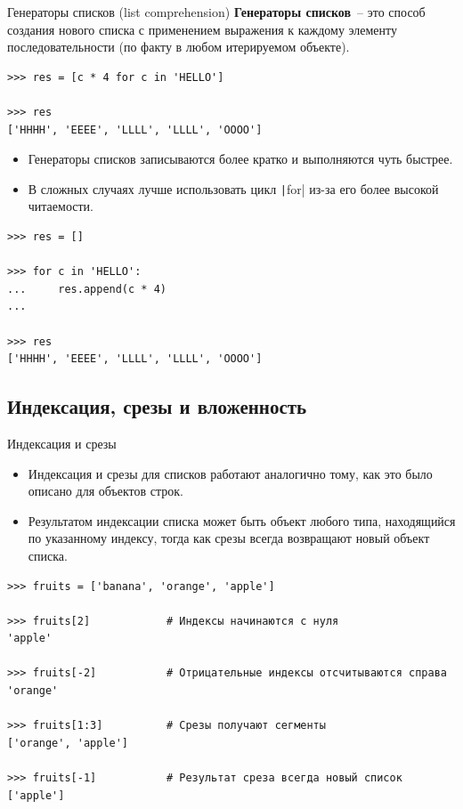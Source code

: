 \documentclass[aspectratio=169, mathserif]{beamer}%
\begin{document}
\begin{frame}[fragile]{Генераторы списков (list comprehension)}
\scriptsize
\textcolor{extraorange}{\textbf{Генераторы списков}}~-- это способ создания нового списка с применением выражения к каждому элементу последовательности (по факту в любом итерируемом объекте).

\begin{verbatim}
>>> res = [c * 4 for c in 'HELLO']

>>> res
['HHHH', 'EEEE', 'LLLL', 'LLLL', 'OOOO']
\end{verbatim}

\begin{itemize}
\item Генераторы списков записываются более кратко и выполняются чуть быстрее.

\item В сложных случаях лучше использовать цикл \texttt|for| из-за его более высокой читаемости.
\end{itemize}

\begin{verbatim}
>>> res = []

>>> for c in 'HELLO':
...     res.append(c * 4)
...

>>> res
['HHHH', 'EEEE', 'LLLL', 'LLLL', 'OOOO']
\end{verbatim}
\vfill
\end{frame}


\subsection{Индексация, срезы и вложенность}

\begin{frame}[fragile]{Индексация и срезы}
\scriptsize
\begin{itemize}
\item Индексация  и срезы для списков работают аналогично тому, как это было описано для объектов строк. 

\item Результатом индексации списка может быть объект любого типа, находящийся по указанному индексу, тогда как  срезы всегда возвращают новый объект списка.
\end{itemize}

\begin{verbatim}
>>> fruits = ['banana', 'orange', 'apple']

>>> fruits[2]            # Индексы начинаются с нуля
'apple'

>>> fruits[-2]           # Отрицательные индексы отсчитываются справа
'orange'

>>> fruits[1:3]          # Срезы получают сегменты
['orange', 'apple']

>>> fruits[-1]           # Результат среза всегда новый список
['apple']
\end{verbatim}
\vfill
\end{frame}
\end{document}
